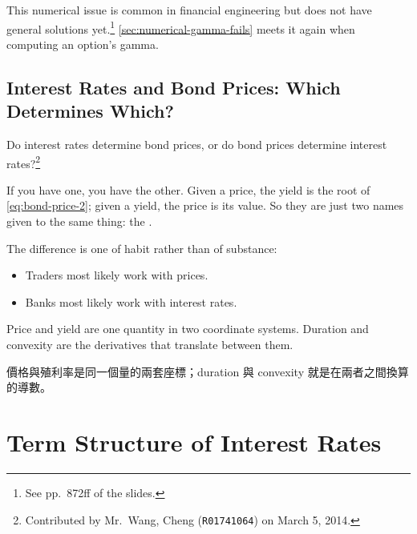 This numerical issue is common in financial engineering but does not have general solutions yet.\footnote{See pp.~872ff of the slides.}
\autoref{sec:numerical-gamma-fails} meets it again when computing an option's gamma.

\section{Interest Rates and Bond Prices: Which Determines Which?}


\begin{question}
	Do interest rates determine bond prices, or do bond prices determine interest rates?\footnote{Contributed by Mr.~Wang, Cheng (\texttt{R01741064}) on March 5, 2014.}
\end{question}

If you have one, you have the other.
Given a price, the yield is the root of \eqref{eq:bond-price-2}; given a yield, the price is its value.
So they are just two names given to the same thing: the .

The difference is one of habit rather than of substance:

\begin{itemize}[nosep]
	\item Traders most likely work with prices.
	\item Banks most likely work with interest rates.
\end{itemize}

\suppstart
\begin{moral}
	Price and yield are one quantity in two coordinate systems.
	Duration and convexity are the derivatives that translate between them.

	價格與殖利率是同一個量的兩套座標；duration 與 convexity 就是在兩者之間換算的導數。
\end{moral}
\suppend

\chapter{Term Structure of Interest Rates}


